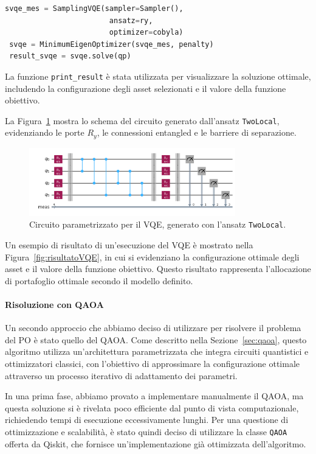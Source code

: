 \begin{lstlisting}[language=python]
 svqe_mes = SamplingVQE(sampler=Sampler(), 
                        ansatz=ry, 
                        optimizer=cobyla)
 svqe = MinimumEigenOptimizer(svqe_mes, penalty)
 result_svqe = svqe.solve(qp)
\end{lstlisting}

La funzione \texttt{print\_result} è stata utilizzata per visualizzare la soluzione 
ottimale, includendo la configurazione degli asset selezionati e il valore della 
funzione obiettivo.

La Figura~\ref{fig:vqe_circuit} mostra lo schema del circuito generato dall'ansatz 
\texttt{TwoLocal}, evidenziando le porte $R_y$, le connessioni entangled e le 
barriere di separazione.

\begin{figure}[h!]
    \centering
    \includegraphics[width=0.8\textwidth]{images/circuitoVQE.png}
    \caption{Circuito parametrizzato per il VQE, generato con l'ansatz \texttt{TwoLocal}.}
    \label{fig:vqe_circuit}
\end{figure}

Un esempio di risultato di un'esecuzione del VQE è mostrato nella Figura~\ref{fig:risultatoVQE}, 
in cui si evidenziano la configurazione ottimale degli asset e il valore della 
funzione obiettivo. Questo risultato rappresenta l'allocazione di portafoglio 
ottimale secondo il modello definito.



\paragraph{Risoluzione con QAOA}
Un secondo approccio che abbiamo deciso di utilizzare per risolvere il problema del PO 
è stato quello del QAOA. Come descritto nella Sezione~\ref{sec:qaoa}, questo algoritmo 
utilizza un'architettura parametrizzata che integra circuiti quantistici e ottimizzatori 
classici, con l'obiettivo di approssimare la configurazione ottimale attraverso un 
processo iterativo di adattamento dei parametri.

In una prima fase, abbiamo provato a implementare manualmente il QAOA, ma questa 
soluzione si è rivelata poco efficiente dal punto di vista computazionale, richiedendo 
tempi di esecuzione eccessivamente lunghi. Per una questione di ottimizzazione e 
scalabilità, è stato quindi deciso di utilizzare la classe \texttt{QAOA} offerta da 
Qiskit, che fornisce un'implementazione già ottimizzata dell'algoritmo.

